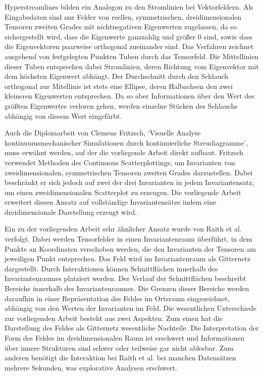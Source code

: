 \documentclass[a4paper,fontsize=12pt,toc=bib,halfparskip]{scrartcl}
\begin{document}
Hyperstreamlines\cite{delmarcelle1993visualizing} bilden ein Analogon zu den Stromlinien bei Vektorfeldern. Als Eingabedaten sind nur Felder von reellen, symmetrischen, dreidimensionalen Tensoren zweiten Grades mit nichtnegativen Eigenwerten zugelassen, da so sichergestellt wird, dass die Eigenwerte ganzzahlig und gr\"o{\ss}er 0 sind, sowie dass die Eigenvektoren paarweise orthogonal zueinander sind. Das Verfahren zeichnet ausgehend von festgelegten Punkten Tuben durch das Tensorfeld. Die Mittellinien dieser Tuben entsprechen dabei Stromlinien, deren Richtung vom Eigenvektor mit dem h\"ochsten Eigenwert abh\"angt. Der Durchschnitt durch den Schlauch orthogonal zur Mitellinie ist stets eine Ellipse, deren Halbachsen den zwei kleineren Eigenwerten entsprechen. Da so aber Informationen \"uber den Wert des gr\"o{\ss}ten Eigenwertes verloren gehen, werden einzelne St\"ucken des Schlauchs abh\"angig von diesem Wert eingef\"arbt.

Auch die Diplomarbeit von Clemens Fritzsch, `Visuelle Analyse kontinuumsmechanischer Simulationen durch kontinuierliche Streudiagramme'\cite{fritzsch2016continuousScatterplot}, muss erw\"ahnt werden, auf der die vorliegende Arbeit direkt aufbaut. Fritzsch verwendet Methoden des Continuous Scatterplottings, um Invarianten von zweidimensionalen, symmetrischen Tensoren zweiten Grades darzustellen. Dabei beschr\"ankt er sich jedoch auf zwei der drei Invarianten in jedem Invariantensatz, um einen zweidimensionalen Scatterplot zu erzeugen. Die vorliegende Arbeit erweitert diesen Ansatz auf vollst\"andige Invariantens\"atze indem eine dreidimensionale Darstellung erzeugt wird.

Ein zu der vorliegenden Arbeit sehr \"ahnlicher Ansatz wurde von Raith et al. \cite{raith2019tensor} verfolgt. Dabei werden Tensorfelder in einen Invariantenraum \"uberf\"uhrt, in dem Punkte an Koordinaten verschoben werden, die den Invarianten der Tensoren am jeweiligen Punkt entsprechen. Das Feld wird im Invariantenraum als Gitternetz dargestellt. Durch Interaktionen k\"onnen Schnittfl\"achen innerhalb des Invariantenraumes platziert werden. Der Verlauf der Schnittfl\"achen beschreibt Bereiche innerhalb des Invariantenraumes. Die Grenzen dieser Bereiche werden daraufhin in einer Repr\"asentation des Feldes im Ortsraum eingezeichnet, abh\"angig von den Werten der Invarianten im Feld. Die wesentlichen Unterschiede zur vorliegenden Arbeit besteht aus zwei Aspekten. Zum einen hat die Darstellung des Feldes als Gitternetz wesentliche Nachteile. Die Interpretation der Form des Feldes im dreidimensionalen Raum ist erschwert und Informationen \"uber innere Strukturen sind schwer oder teilweise gar nicht ablesbar. Zum anderen ben\"otigt die Interaktion bei Raith et al. bei manchen Datens\"atzen mehrere Sekunden, was explorative Analysen erschwert.
\end{document}
